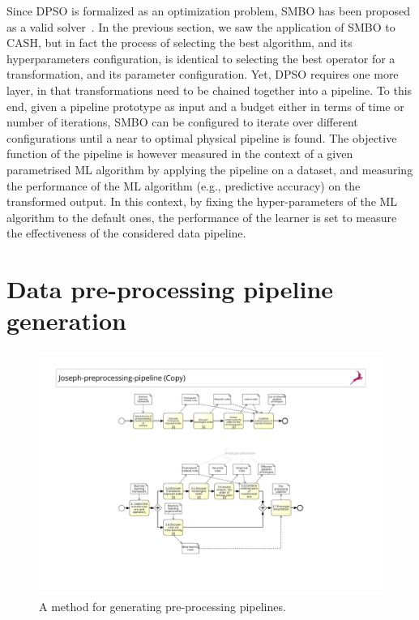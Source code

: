 Since DPSO is formalized as an optimization problem, SMBO has been proposed as a valid solver\textcolor{red}{~\cite{hutter2011sequential}}. In the previous section, we saw the application of SMBO to CASH, but in fact the process of selecting the best algorithm, and its hyperparameters configuration, is identical to selecting the best operator for a transformation, and its parameter configuration. Yet, DPSO requires one more layer, in that transformations need to be chained together into a pipeline.
To this end, given a pipeline prototype as input and a budget either in terms of time or number of iterations, SMBO can be configured to iterate over different configurations until a near to optimal physical pipeline is found. The objective function of the pipeline is however measured in the context of a given parametrised ML algorithm by applying the pipeline on a dataset, and measuring the performance of the ML algorithm (e.g., predictive accuracy) on the transformed output. In this context, by fixing the hyper-parameters of the ML algorithm to the default ones, the performance of the learner is set to measure the effectiveness of the considered data pipeline. 


\section{Data pre-processing pipeline generation} 
\label{sec:methodology}

\begin{figure}[t]
    \centering
    \includegraphics[clip, trim=6.5cm 3.5cm 6.5cm 8cm,width=1.0\textwidth]{chapters/data-centric/supervised/img/bpmn.pdf}
    \caption{A method for generating pre-processing pipelines.}
    \label{fig:methodology}
\end{figure}

